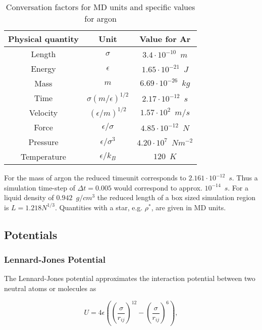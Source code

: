 \documentclass[a4paper]{article}
\begin{document}
\begin{table}[h]
\begin{center}
\begin{tabular}{|c|c|c|}
\hline 
Physical quantity & Unit & Value for Ar \\ 
\hline 
Length & $\sigma$ & $3.4 \cdot 10^{-10} \enspace m$  \\ 
\hline 
Energy & $\epsilon$ & $1.65 \cdot 10^{-21} \enspace J$	 \\ 
\hline 
Mass & $m$ & $6.69 \cdot 10^{-26} \enspace kg$ \\ 
\hline 
Time & $\sigma(m/ \epsilon)^{1/2}$ & $2.17 \cdot 10^{-12} \enspace s$ \\ 
\hline 
Velocity & $(\epsilon/m)^{1/2}$ & $1.57 \cdot 10^2 \enspace m/s$ \\ 
\hline 
Force & $\epsilon/\sigma$ & $4.85 \cdot 10^{-12} \enspace N$ \\ 
\hline 
Pressure & $\epsilon/\sigma^3$ & $4.20 \cdot 10^7 \enspace Nm^{-2}$ \\ 
\hline 
Temperature & $\epsilon/k_B$ & $120 \enspace K$ \\ 
\hline 
\end{tabular} 
\caption{Conversation factors for MD units  and specific values for argon}
\label{tab:conversation_factors}
\end{center}
\end{table}

For the mass of argon the reduced timeunit corresponds to $2.161 \cdot 10^{-12} \enspace s$. Thus a simulation time-step of $\Delta t = 0.005$ would correspond to approx. $10^{-14} \enspace s$. For a liquid density of $0.942 \enspace g/cm^3$ the reduced length of a box sized simulation region is $L = 1.218 N^{1/3}$. Quantities with a star, e.g. $\rho^*$, are given in MD units.

\subsection{Potentials}
\label{subsec:potentials}

\subsubsection{Lennard-Jones Potential}
\label{subsubsec:lennard-jones-potential}

The Lennard-Jones potential approximates the interaction potential between two neutral atoms or molecules as 

\begin{equation}
U = 4 \epsilon \left( \left( \frac{\sigma}{r_{ij}} \right)^{12} - \left( \frac{\sigma}{r_{ij}} \right)^6 \right),
\label{eq:lennard_jones}
\end{equation}
\end{document}
